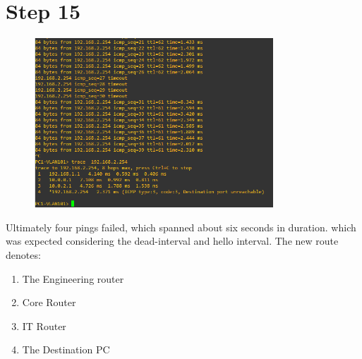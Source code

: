 \documentclass{article}
\begin{document}
	\section{Step 15}
		\begin{figure}[h!]
			\centering
			\includegraphics[width=0.8\textwidth]{step_15_trace_with_pings}
		\end{figure}
		Ultimately four pings failed, which spanned about six seconds in duration. which was expected considering the dead-interval and hello interval. The new route denotes:
		\begin{enumerate}
			\item The Engineering router
			\item Core Router
			\item IT Router
			\item The Destination PC
		\end{enumerate}
		\newpage
\end{document}
